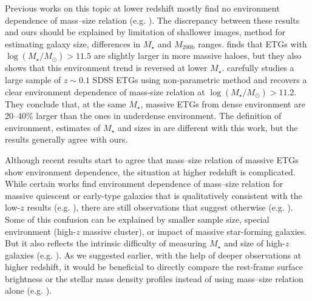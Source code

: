 \documentclass[a4paper,fleqn,usenatbib]{mnras}
\def\mstar{{$M_{\star}$}}
\def\mhalo{{$M_{\mathrm{200b}}$}}
\def\logms{{$\log (M_{\star}/M_{\odot})$}}
\begin{document}
    Previous works on this topic at lower redshift mostly find no environment dependence
    of mass--size relation (e.g. \citealt{Nair2010, Maltby2010, Cappellari2013, 
    HCompany13}).  
    The discrepancy between these results and ours should be explained by limitation of 
    shallower images, method for estimating galaxy size, differences in \mstar{} and 
    \mhalo{} ranges. 
    \citet{Cerbrian2014} finds that ETGs with \logms{}$>11.5$ are slightly larger in 
    more massive haloes, but they also shows that this environment trend is reversed 
    at lower \mstar{}. 
    \citet{Yoon2017} carefully studies a large sample of $z\sim0.1$ SDSS ETGs using  
    non-parametric method and recovers a clear environment dependence of mass-size 
    relation at \logms{}$>11.2$. 
    They conclude that, at the same \mstar{}, massive ETGs from dense environment 
    are 20--40\% larger than the ones in underdense environment. 
    The definition of environment, estimates of \mstar{} and sizes in \citet{Yoon2017} 
    are different with this work, but the results generally agree with ours.
    
    Although recent results start to agree that mass--size relation of massive
    ETGs show environment dependence, the situation at higher redshift is complicated. 
    While certain works find environment dependence of mass--size relation for massive 
    quiescent or early-type galaxies that is qualitatively consistent with the 
    low-$z$ results (e.g. \citealt{Papovich2012, Lani2013, Strazzullo2013, 
    Delaye2014}), there are still observations that suggest otherwise (e.g. 
    \citealt{Rettura2010, Raichoor2012, Kelkar2015, Allen2015}). 
    Some of this confusion can be explained by smaller sample size, special environment
    (high-$z$ massive cluster), or impact of massive star-forming galaxies. 
    But it also reflects the intrinsic difficulty of measuring \mstar{} and size 
    of high-$z$ galaxies (e.g. \cite{Price2017}).
    As we suggested earlier, with the help of deeper observations at higher redshift, 
    it would be beneficial to directly compare the rest-frame surface brightness 
    or the stellar mass density profiles instead of using mass--size relation alone 
    (e.g. \citealt{Szomoru2012, Patel2013, Buitrago2017, Hill2017}).

\end{document}
